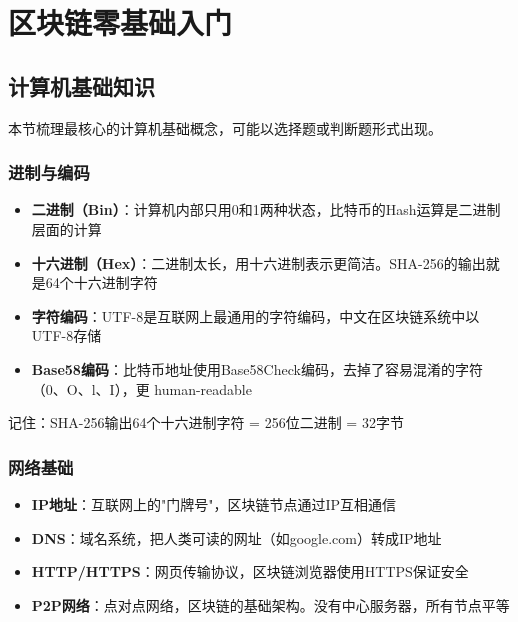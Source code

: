﻿\documentclass[12pt,a4paper]{article}
\begin{document}
\newpage
\tableofcontents

\newpage

\section{区块链零基础入门}

\subsection{计算机基础知识}

本节梳理最核心的计算机基础概念，可能以选择题或判断题形式出现。

\subsubsection{进制与编码}

\begin{itemize}[leftmargin=1.5em]
\item \textbf{二进制（Bin）}：计算机内部只用0和1两种状态，比特币的Hash运算是二进制层面的计算
\item \textbf{十六进制（Hex）}：二进制太长，用十六进制表示更简洁。SHA-256的输出就是64个十六进制字符
\item \textbf{字符编码}：UTF-8是互联网上最通用的字符编码，中文在区块链系统中以UTF-8存储
\item \textbf{Base58编码}：比特币地址使用Base58Check编码，去掉了容易混淆的字符（0、O、l、I），更 human-readable
\end{itemize}

\begin{keypointbox}
记住：SHA-256输出64个十六进制字符 = 256位二进制 = 32字节
\end{keypointbox}

\subsubsection{网络基础}

\begin{itemize}[leftmargin=1.5em]
\item \textbf{IP地址}：互联网上的"门牌号"，区块链节点通过IP互相通信
\item \textbf{DNS}：域名系统，把人类可读的网址（如google.com）转成IP地址
\item \textbf{HTTP/HTTPS}：网页传输协议，区块链浏览器使用HTTPS保证安全
\item \textbf{P2P网络}：点对点网络，区块链的基础架构。没有中心服务器，所有节点平等
\end{itemize}
\end{document}
